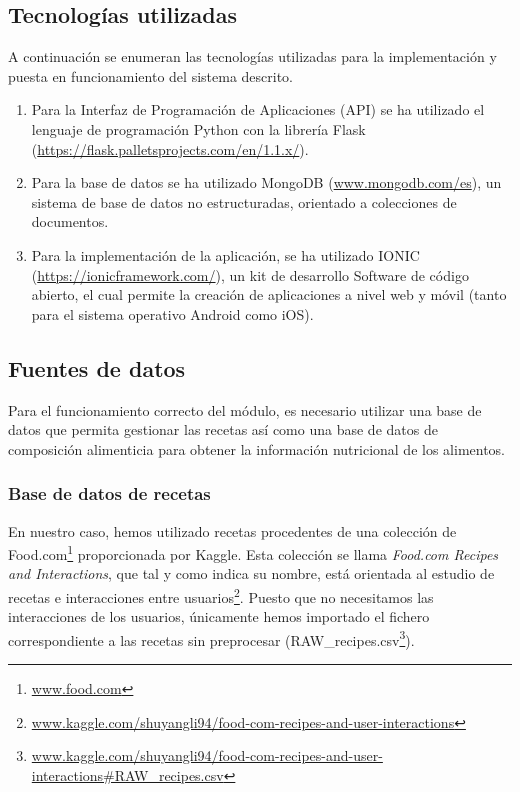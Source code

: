 \subsection{Tecnologías utilizadas}

A continuación se enumeran las tecnologías utilizadas para la implementación y puesta en funcionamiento del sistema descrito.

\begin{enumerate}
    \item Para la Interfaz de Programación de Aplicaciones (API) se ha utilizado el lenguaje de programación Python con la librería Flask (\url{https://flask.palletsprojects.com/en/1.1.x/}).
    
    \item Para la base de datos se ha utilizado MongoDB (\url{www.mongodb.com/es}), un sistema de base de datos no estructuradas, orientado a colecciones de documentos. 
    
    \item Para la implementación de la aplicación, se ha utilizado IONIC  (\url{https://ionicframework.com/}), un kit de desarrollo Software de código abierto, el cual permite la creación de aplicaciones a nivel web y móvil (tanto para el sistema operativo Android como iOS). 
    
\end{enumerate}


\subsection{Fuentes de datos}\label{sec:bd_recetas}
Para el funcionamiento correcto del módulo, es necesario utilizar una base de datos que permita gestionar las recetas así como una base de datos de composición alimenticia para obtener la información nutricional de los alimentos.

\subsubsection{Base de datos de recetas}
En nuestro caso, hemos utilizado recetas procedentes de una colección de Food.com\footnote{\url{www.food.com}} proporcionada por Kaggle. Esta colección se llama  \textit{Food.com Recipes and Interactions}, que tal y como indica su nombre, está orientada al estudio de recetas e interacciones entre usuarios\footnote{\url{www.kaggle.com/shuyangli94/food-com-recipes-and-user-interactions}}. Puesto que no necesitamos las interacciones de los usuarios, únicamente hemos importado el fichero correspondiente a las recetas sin preprocesar (RAW\_recipes.csv\footnote{\url{www.kaggle.com/shuyangli94/food-com-recipes-and-user-interactions\#RAW\_recipes.csv}}).

